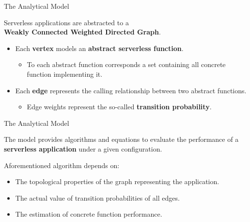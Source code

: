 \documentclass[13.5pt]{beamer}
\newcommand{\B}[1]{\textcolor{TorVergataColor}{\textbf{#1}}}
\begin{document}
\begin{frame}{The Analytical Model}
	
	\begin{block}{}
		\centering
		Serverless applications are abstracted to a \\\B{Weakly Connected Weighted Directed Graph}.
	\end{block}
	\vspace{\baselineskip}
	\begin{itemize}
		\item Each \B{vertex} models an \B{abstract serverless function}.
		\begin{itemize}
			\item To each abstract function corresponds a set containing all concrete function implementing it.
		\end{itemize}
		\vspace{\baselineskip}
		\item Each \B{edge} represents the calling relationship between two abstract functions. 
		\begin{itemize}
		\item Edge weights represent the so-called \B{transition probability}. 
		 \end{itemize}
		
	\end{itemize}
		
\end{frame} 
\begin{frame}{The Analytical Model}
	
	
	\begin{block}{}
		The model provides algorithms and equations to evaluate the performance of a \B{serverless application} under a given configuration.
	\end{block}
	\vspace{\baselineskip}
	
	Aforementioned algorithm depends on:
	\begin{itemize}
		\item The topological properties of the graph representing the application.
		\item The actual value of transition probabilities of all edges.
		\item The estimation of concrete function performance.
	\end{itemize}
	
\end{frame}
\end{document}
